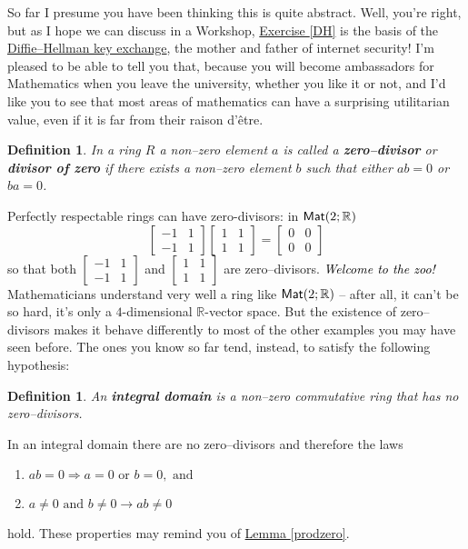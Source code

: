 \documentclass[11pt]{amsbook}
\newtheorem{definition}[theorem]{Definition}
\theoremstyle{definition}
\begin{document}
So far I presume you have been thinking this is quite abstract. Well, you're right, but as I hope we can discuss in a Workshop, \hyperref[DH]{Exercise \ref{DH}} is the basis of the \href{http://en.wikipedia.org/wiki/Diffie-Hellman_key_exchange}{Diffie--Hellman key exchange}, the mother and father of internet security! I'm pleased to be able to tell you that, because you will become ambassadors for Mathematics when you leave the university, whether you like it or not, and I'd like you to see that most areas of mathematics can have a surprising utilitarian value, even if it is far from their raison d'\^etre.

\begin{definition} \label{zerodivdef} In a ring $R$ a non--zero element $a$ is called a \textbf{zero--divisor} or \textbf{divisor of zero} if there exists a non--zero element $b$ such that either $ab = 0$ or $ba = 0$.
\end{definition}

Perfectly respectable rings can have zero-divisors: in ${\sf Mat}(2; \mathbb{R})$ $$\begin{bmatrix} -1 & 1 \\ -1 & 1 \end{bmatrix} \begin{bmatrix} 1 & 1\\ 1 & 1 \end{bmatrix} = \begin{bmatrix} 0 & 0 \\ 0 & 0 \end{bmatrix}$$ so that both $\begin{bmatrix} -1 & 1 \\ -1 & 1 \end{bmatrix}$ and $\begin{bmatrix} 1 & 1\\ 1 & 1 \end{bmatrix}$ are zero--divisors.
\textcolor{black}{\it Welcome to the zoo!} Mathematicians understand very well a ring like ${\sf Mat}(2; \mathbb{R})$ -- after all, it can't be so hard, it's only a $4$-dimensional $\mathbb{R}$-vector space. But the existence of zero--divisors makes it behave differently to most of the other examples you may have seen before. The ones you know so far tend, instead, to satisfy the following hypothesis:

\begin{definition} An \textbf{integral domain} is a non--zero commutative ring that has no zero--divisors.
\end{definition}
In an integral domain there are no zero--divisors and therefore the laws
\begin{enumerate}
\item $ab=0 \Rightarrow a= 0 \text{ or } b = 0, \text{ and} $
\item $a\neq 0 \text{ and } b\neq 0 \to ab \neq 0$
\end{enumerate} hold. These properties may remind you of \hyperref[prodzero]{Lemma \ref{prodzero}}.
\end{document}
